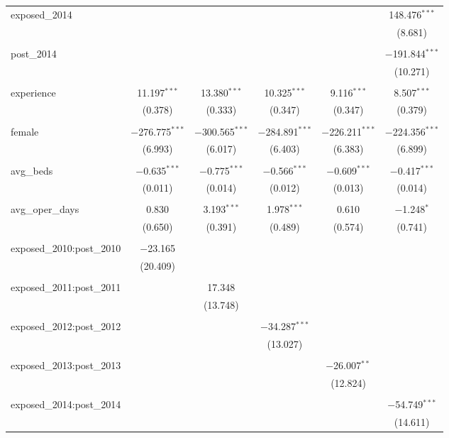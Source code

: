 \begin{table}[!htbp]
\begin{tabular}{@{\extracolsep{5pt}}lccccc}
 exposed\_2014 &  &  &  &  & 148.476$^{***}$ \\ 
  &  &  &  &  & (8.681) \\ 
  & & & & & \\ 
 post\_2014 &  &  &  &  & $-$191.844$^{***}$ \\ 
  &  &  &  &  & (10.271) \\ 
  & & & & & \\ 
 experience & 11.197$^{***}$ & 13.380$^{***}$ & 10.325$^{***}$ & 9.116$^{***}$ & 8.507$^{***}$ \\ 
  & (0.378) & (0.333) & (0.347) & (0.347) & (0.379) \\ 
  & & & & & \\ 
 female & $-$276.775$^{***}$ & $-$300.565$^{***}$ & $-$284.891$^{***}$ & $-$226.211$^{***}$ & $-$224.356$^{***}$ \\ 
  & (6.993) & (6.017) & (6.403) & (6.383) & (6.899) \\ 
  & & & & & \\ 
 avg\_beds & $-$0.635$^{***}$ & $-$0.775$^{***}$ & $-$0.566$^{***}$ & $-$0.609$^{***}$ & $-$0.417$^{***}$ \\ 
  & (0.011) & (0.014) & (0.012) & (0.013) & (0.014) \\ 
  & & & & & \\ 
 avg\_oper\_days & 0.830 & 3.193$^{***}$ & 1.978$^{***}$ & 0.610 & $-$1.248$^{*}$ \\ 
  & (0.650) & (0.391) & (0.489) & (0.574) & (0.741) \\ 
  & & & & & \\ 
 exposed\_2010:post\_2010 & $-$23.165 &  &  &  &  \\ 
  & (20.409) &  &  &  &  \\ 
  & & & & & \\ 
 exposed\_2011:post\_2011 &  & 17.348 &  &  &  \\ 
  &  & (13.748) &  &  &  \\ 
  & & & & & \\ 
 exposed\_2012:post\_2012 &  &  & $-$34.287$^{***}$ &  &  \\ 
  &  &  & (13.027) &  &  \\ 
  & & & & & \\ 
 exposed\_2013:post\_2013 &  &  &  & $-$26.007$^{**}$ &  \\ 
  &  &  &  & (12.824) &  \\ 
  & & & & & \\ 
 exposed\_2014:post\_2014 &  &  &  &  & $-$54.749$^{***}$ \\ 
  &  &  &  &  & (14.611) \\ 

\end{tabular}
\end{table}
